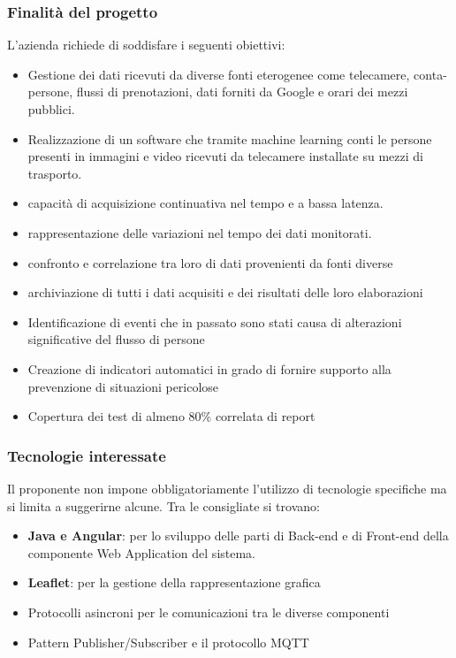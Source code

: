 		\subsubsection{Finalità del progetto}
			L’azienda richiede di soddisfare i seguenti obiettivi:
			\begin{itemize}
				\item Gestione dei dati ricevuti da diverse fonti eterogenee come telecamere, conta-persone, flussi di prenotazioni, dati forniti da Google e orari dei mezzi pubblici.
				\item Realizzazione di un software che tramite machine learning conti le persone presenti in immagini e video ricevuti da telecamere installate su mezzi di trasporto.
				\item capacità di acquisizione continuativa nel tempo e a bassa latenza.
				\item rappresentazione delle variazioni nel tempo dei dati monitorati.
				\item confronto e correlazione tra loro di dati provenienti da fonti diverse
				\item archiviazione di tutti i dati acquisiti e dei risultati delle loro elaborazioni
				\item Identificazione di eventi che in passato sono stati causa di alterazioni significative del flusso di persone
				\item Creazione di indicatori automatici in grado di fornire supporto alla prevenzione di situazioni pericolose
				\item Copertura dei test di almeno 80\% correlata di report
			\end{itemize}
		\subsubsection{Tecnologie interessate}
			Il proponente non impone obbligatoriamente l’utilizzo di tecnologie specifiche ma si limita a suggerirne alcune. Tra le consigliate si trovano:
			\begin{itemize}
				\item\textbf{Java e Angular}:  per lo sviluppo delle parti di Back-end e di Front-end della componente Web Application del sistema.
				\item\textbf{Leaflet}:  per la gestione della rappresentazione grafica
				\item Protocolli asincroni per le comunicazioni tra le diverse componenti
				\item Pattern Publisher/Subscriber e il  protocollo MQTT
			\end{itemize}
			
